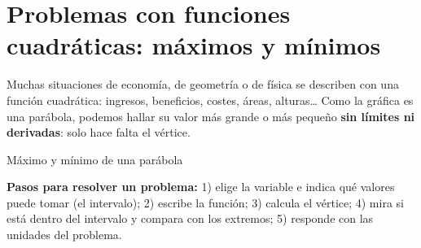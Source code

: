 \documentclass[11pt,a4paper]{article}
\makeatletter
\newcommand{\lt}{<}\newcommand{\gt}{>}
\newcommand{\fmm}[1]{\setbox0=\hbox{$#1$}\ifdim\wd0>0.8\linewidth\def\fmmnext{\fmmdisp{#1}}\else\def\fmmnext{\mbox{\box0}}\fi\fmmnext}
\def\fmmdisp#1{\@ifnextchar.{\fmmdispp{#1}}{\@ifnextchar,{\fmmdispc{#1}}{\@ifnextchar;{\fmmdisps{#1}}{\fmdisp{#1}}}}}
\def\fmmdispp#1.{\fmdisp{#1\,.}}\def\fmmdispc#1,{\fmdisp{#1\,,}}\def\fmmdisps#1;{\fmdisp{#1\,;}}
\newcommand{\fmdisp}[1]{\[\setbox2=\hbox{$\displaystyle #1$}\ifdim\wd2>\linewidth\resizebox{\linewidth}{!}{\box2}\else\box2\fi\]}
\makeatother
\begin{document}
\section{Problemas con funciones cuadráticas: máximos y mínimos}\hypertarget{sec9}{}

Muchas situaciones de economía, de geometría o de física se describen con una función cuadrática: ingresos, beneficios, costes, áreas, alturas\dots{} Como la gráfica es una parábola, podemos hallar su valor más grande o más pequeño \textbf{sin límites ni derivadas}: solo hace falta el vértice.

\begin{fmdef}{Máximo y mínimo de una parábola}

\textbf{Pasos para resolver un problema:} 1) elige la variable e indica qué valores puede tomar (el intervalo); 2) escribe la función; 3) calcula el vértice; 4) mira si está dentro del intervalo y compara con los extremos; 5) responde con las unidades del problema.
\end{fmdef}
\end{document}
